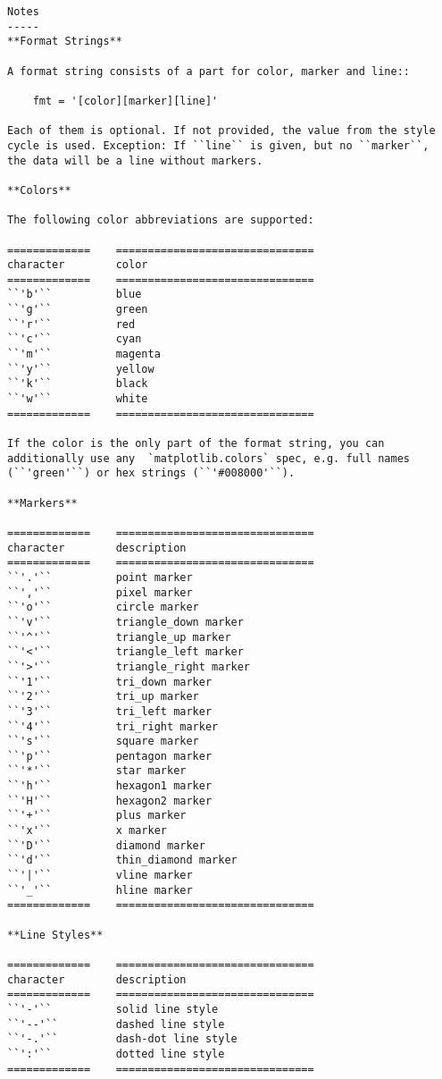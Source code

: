 \documentclass[11pt]{article}
\begin{document}
\begin{verbatim}
Notes
-----
**Format Strings**

A format string consists of a part for color, marker and line::

    fmt = '[color][marker][line]'

Each of them is optional. If not provided, the value from the style
cycle is used. Exception: If ``line`` is given, but no ``marker``,
the data will be a line without markers.

**Colors**

The following color abbreviations are supported:

=============    ===============================
character        color
=============    ===============================
``'b'``          blue
``'g'``          green
``'r'``          red
``'c'``          cyan
``'m'``          magenta
``'y'``          yellow
``'k'``          black
``'w'``          white
=============    ===============================

If the color is the only part of the format string, you can
additionally use any  `matplotlib.colors` spec, e.g. full names
(``'green'``) or hex strings (``'#008000'``).

**Markers**

=============    ===============================
character        description
=============    ===============================
``'.'``          point marker
``','``          pixel marker
``'o'``          circle marker
``'v'``          triangle_down marker
``'^'``          triangle_up marker
``'<'``          triangle_left marker
``'>'``          triangle_right marker
``'1'``          tri_down marker
``'2'``          tri_up marker
``'3'``          tri_left marker
``'4'``          tri_right marker
``'s'``          square marker
``'p'``          pentagon marker
``'*'``          star marker
``'h'``          hexagon1 marker
``'H'``          hexagon2 marker
``'+'``          plus marker
``'x'``          x marker
``'D'``          diamond marker
``'d'``          thin_diamond marker
``'|'``          vline marker
``'_'``          hline marker
=============    ===============================

**Line Styles**

=============    ===============================
character        description
=============    ===============================
``'-'``          solid line style
``'--'``         dashed line style
``'-.'``         dash-dot line style
``':'``          dotted line style
=============    ===============================


\end{verbatim}
\end{document}
